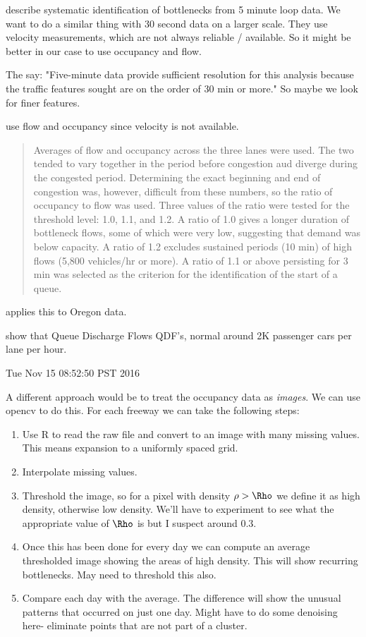\documentclass[12pt]{article}
\begin{document}
\cite{chen2004systematic} describe systematic identification of bottlenecks from 5
minute loop data. We want to do a similar thing with 30 second data on a larger scale.
They use velocity measurements, which are not always reliable / available. So it might be 
better in our case to use occupancy and flow.

The say: "Five-minute data provide sufficient
resolution for this analysis because the traffic features sought are on
the order of 30 min or more." So maybe we look for finer features.

\cite{hall1991freeway} use flow and occupancy since velocity is not available.

\begin{quote}
Averages of flow and occupancy across the three lanes were
used. The two tended to vary together in the period before
congestion aud diverge during the congested period. Determining
the exact beginning and end of congestion was,
however, difficult from these numbers, so the ratio of occupancy
to flow was used. Three values of the ratio were tested
for the threshold level: 1.0, 1.1, and 1.2. A ratio of 1.0 gives
a longer duration of bottleneck flows, some of which were
very low, suggesting that demand was below capacity. A ratio
of 1.2 excludes sustained periods (10 min) of high flows (5,800
vehicles/hr or more). A ratio of 1.1 or above persisting for 3
min was selected as the criterion for the identification of the
start of a queue. 
\end{quote}

\cite{wieczorek2010techniques} applies this to Oregon data.

\cite{zhang2004some} show that Queue Discharge Flows QDF's, normal around 2K
passenger cars per lane per hour.

Tue Nov 15 08:52:50 PST 2016

A different approach would be to treat the occupancy data as \emph{images}.
We can use opencv to do this. For each freeway we can take the following
steps:
\begin{enumerate}
    \item Use R to read the raw file and convert to an image with many missing
        values. This means expansion to a uniformly spaced grid.
    \item Interpolate missing values. 
    \item Threshold the image, so for a pixel with density $\rho > \Rho$
        we define it as high density, otherwise low density. We'll
        have to experiment to see what the appropriate value of $\Rho$ is
        but I suspect around 0.3.
    \item Once this has been done for every day we can compute an average
        thresholded image showing the areas of high density. This will show
        recurring bottlenecks. May need to threshold this also.
    \item Compare each day with the average. The difference will show the
        unusual patterns that occurred on just one day. Might have to do
        some denoising here- eliminate points that are not part of a 
        cluster.
\end{enumerate}
\end{document}
